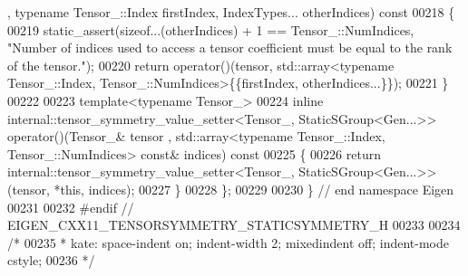 \begin{DoxyCode}
      , \textcolor{keyword}{typename} Tensor\_::Index firstIndex, IndexTypes... otherIndices)\textcolor{keyword}{ const}
00218 \textcolor{keyword}{    }\{
00219       static\_assert(\textcolor{keyword}{sizeof}...(otherIndices) + 1 == Tensor\_::NumIndices, \textcolor{stringliteral}{"Number of indices used to access a
       tensor coefficient must be equal to the rank of the tensor."});
00220       \textcolor{keywordflow}{return} operator()(tensor, std::array<typename Tensor\_::Index, Tensor\_::NumIndices>\{\{firstIndex, 
      otherIndices...\}\});
00221     \}
00222 
00223     \textcolor{keyword}{template}<\textcolor{keyword}{typename} Tensor\_>
00224     \textcolor{keyword}{inline} internal::tensor\_symmetry\_value\_setter<Tensor\_, StaticSGroup<Gen...>> operator()(Tensor\_& tensor
      , std::array<typename Tensor\_::Index, Tensor\_::NumIndices> \textcolor{keyword}{const}& indices)\textcolor{keyword}{ const}
00225 \textcolor{keyword}{    }\{
00226       \textcolor{keywordflow}{return} internal::tensor\_symmetry\_value\_setter<Tensor\_, StaticSGroup<Gen...>>(tensor, *\textcolor{keyword}{this}, indices);
00227     \}
00228 \};
00229 
00230 \} \textcolor{comment}{// end namespace Eigen}
00231 
00232 \textcolor{preprocessor}{#endif // EIGEN\_CXX11\_TENSORSYMMETRY\_STATICSYMMETRY\_H}
00233 
00234 \textcolor{comment}{/*}
00235 \textcolor{comment}{ * kate: space-indent on; indent-width 2; mixedindent off; indent-mode cstyle;}
00236 \textcolor{comment}{ */}
\end{DoxyCode}
